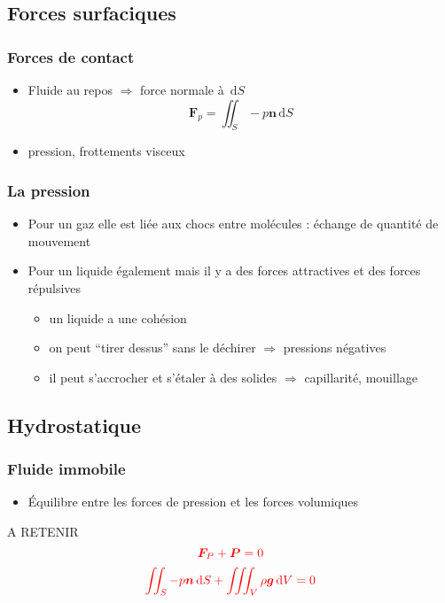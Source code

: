 \documentclass[%
	final, %
	 10pt, %
 	compress, %
hyperref={bookmarks=true}	
]{beamer}
\renewcommand{\v}[1]{\ensuremath{\bm{#1}}} %
\newcommand{\ddr}[1]{\, \mathrm{d} #1}
\begin{document}
\subsection{Forces surfaciques}
\label{sec:forces-surfaciques}

\begin{frame}\frametitle{Forces de contact}
\begin{itemize}
\item Fluide au repos $\Rightarrow$ force normale à $\ddr S$ 
\begin{dmath*}
\v{F}_{p} = \iint_{S} -p  \v{n} \ddr S 
\end{dmath*}
\item pression, frottements visceux
\end{itemize}
\end{frame}

\begin{frame}\frametitle{La pression}
\begin{itemize}
\item Pour un gaz elle est liée aux chocs entre molécules : échange de quantité de mouvement
\item Pour un liquide également mais il y a des forces attractives et
  des forces répulsives
\begin{itemize}
\item un liquide a une cohésion
\item on peut \enquote{tirer dessus} sans le déchirer $\Rightarrow$
  pressions négatives
\item il peut s'accrocher et s'étaler à des solides $\Rightarrow$
  capillarité, mouillage
\end{itemize}
\end{itemize}
\end{frame}




\subsection{Hydrostatique}
\label{sec:hydrostatique-1}



\begin{frame}\frametitle{Fluide immobile}
\begin{itemize}
\item Équilibre entre les forces de pression et les forces volumiques
\end{itemize}
\begin{alertblock}{A RETENIR} 
\begin{dmath*}
\textcolor{red}{\v{F}_{P} + \v{P} = 0}
\end{dmath*}
\begin{dmath*}
\textcolor{red}{\iint_{S} - p  \v{n} \ddr S +  \iiint_{V} \rho \v{g} \ddr V = 0}
\end{dmath*}
\end{alertblock}
\end{frame}
\end{document}
